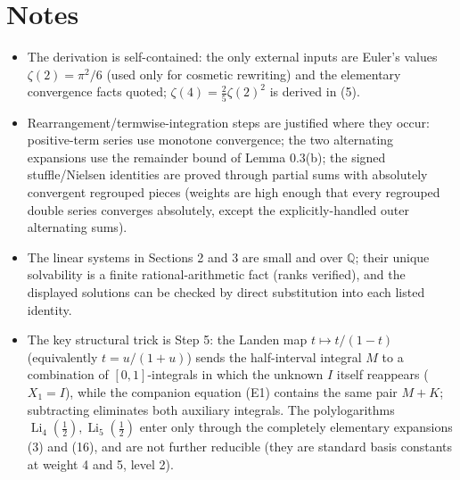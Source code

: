 \documentclass[11pt]{article}
\theoremstyle{remark}
\begin{document}
\section*{Notes}

\begin{itemize}
\item The derivation is self-contained: the only external inputs are Euler's values
  $\zeta(2)=\pi^2/6$ (used only for cosmetic rewriting) and the elementary convergence facts
  quoted; $\zeta(4)=\tfrac25\zeta(2)^2$ is derived in (5).
\item Rearrangement/termwise-integration steps are justified where they occur: positive-term series use
  monotone convergence; the two alternating expansions use the remainder bound of Lemma 0.3(b);
  the signed stuffle/Nielsen identities are proved through partial sums with absolutely convergent
  regrouped pieces (weights are high enough that every regrouped double series converges
  absolutely, except the explicitly-handled outer alternating sums).
\item The linear systems in Sections 2 and 3 are small and over $\mathbb{Q}$; their unique solvability
  is a finite rational-arithmetic fact (ranks verified), and the displayed solutions can be checked
  by direct substitution into each listed identity.
\item The key structural trick is Step 5: the Landen map $t\mapsto t/(1-t)$ (equivalently
  $t=u/(1+u)$) sends the half-interval integral $M$ to a combination of $[0,1]$-integrals in which
  the unknown $I$ itself reappears ($X_1=I$), while the companion equation (E1) contains the same
  pair $M+K$; subtracting eliminates both auxiliary integrals. The polylogarithms
  $\operatorname{Li}_4(\tfrac12),\operatorname{Li}_5(\tfrac12)$ enter only through the completely
  elementary expansions (3) and (16), and are not further reducible (they are standard basis
  constants at weight 4 and 5, level 2).
\end{itemize}
\end{document}
